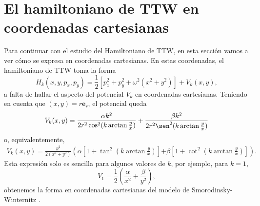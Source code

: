 \documentclass[11pt,a4paper,twoside]{article}
\theoremstyle{definition} \newtheorem{defn}[thm]{Definición}
\theoremstyle{definition} \newtheorem{ejemplo}[thm]{Ejemplo}
\theoremstyle{definition} \newtheorem{ejercicio}[thm]{Ejercicio}
\theoremstyle{remark} \newtheorem*{obs}{Observación}
\newcommand{\vect}[1]{\mathbf{#1}}
\begin{document}
\section{El hamiltoniano de TTW en coordenadas cartesianas}\label{cartesianas}
Para continuar con el estudio del Hamiltoniano de TTW, en esta sección vamos a ver cómo se expresa en coordenadas cartesianas.
En estas coordenadas, el hamiltoniano de TTW toma la forma
\begin{equation}
  H_k(x,y,p_x,p_y)=\frac{1}{2}[p_x^2+p_y^2+\omega^2(x^2+y^2)]+V_k(x,y),
\end{equation}
a falta de hallar el aspecto del potencial $V_k$ en coordenadas cartesianas.
Teniendo en cuenta que $(x,y)=r\vect{e}_r$, el potencial queda
\begin{align}
  V_k(x,y)=\frac{\alpha k^2}{2r^2\cos^2(k\arctan \tfrac{y}{x})} +\frac{\beta k^2}{2r^2\sen^2(k\arctan \tfrac{y}{x})}
\end{align}
o, equivalentemente,
\begin{align}
  V_k(x,y)=\frac{k^2}{2(x^2+y^2)}\left( \alpha\left[ 1+\tan^2\left( k\arctan\frac{y}{x} \right) \right] \right. \left. +\beta\left[ 1+\cot^2\left( k\arctan\frac{y}{x} \right) \right]\right).
\end{align}
Esta expresión solo es sencilla para algunos valores de $k$, por ejemplo, para $k=1$,
\begin{equation}
  V_1=\frac{1}{2}\left( \frac{\alpha}{x^2}+\frac{\beta}{y^2} \right),
\end{equation}
obtenemos la forma en coordenadas cartesianas del modelo de Smorodinsky-Winternitz \cite{frivs}.
\end{document}
